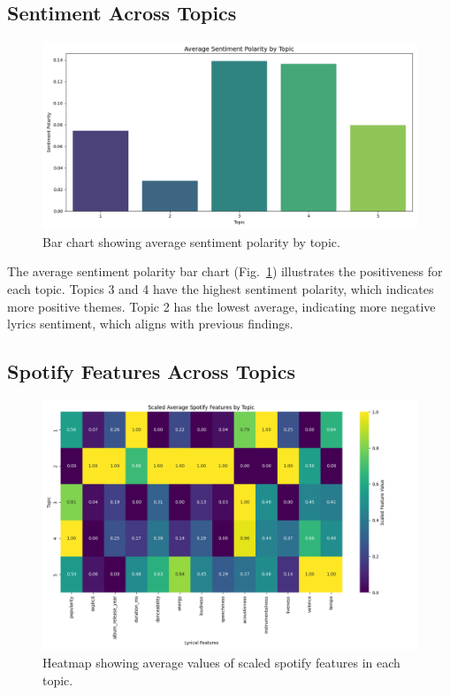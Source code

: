 \subsection{Sentiment Across Topics}
\begin{center}
\begin{figure}[H]
  \centering
  \includegraphics[width=6in]{img/lda_sentiment.png}
  \caption{Bar chart showing average sentiment polarity by topic.}
  \label{Figure:lda_sentiment}
\end{figure}
\end{center}

The average sentiment polarity bar chart (Fig.~\ref{Figure:lda_sentiment}) illustrates the positiveness for each
topic. Topics 3 and 4 have the highest sentiment polarity, which indicates more
positive themes. Topic 2 has the lowest average, indicating more negative
lyrics sentiment, which aligns with previous findings.

\subsection{Spotify Features Across Topics}

\begin{center}
\begin{figure}[H]
  \centering
  \includegraphics[width=6in]{img/lda_spotify_features.png}
  \caption{Heatmap showing average values of scaled spotify features in each
  topic.}
  \label{Figure:lda_spotify_features}
\end{figure}
\end{center}

